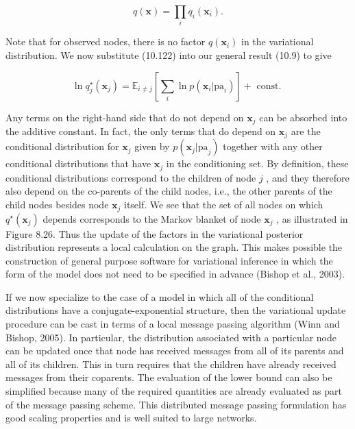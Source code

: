 \documentclass[
  10
]{article}
\begin{document}
\[
q (\mathbf {x}) = \prod_ {i} q _ {i} (\mathbf {x} _ {i}).\tag{10.123}
\]

Note that for observed nodes, there is no factor
\(q ( \mathbf { x } _ { i } )\) in the variational distribution. We now
substitute (10.122) into our general result (10.9) to give

\[
\ln q _ {j} ^ {\star} (\mathbf {x} _ {j}) = \mathbb {E} _ {i \neq j} \left[ \sum_ {i} \ln p (\mathbf {x} _ {i} | \mathrm{pa} _ {i}) \right] + \text { const. }\tag{10.124}
\]

Any terms on the right-hand side that do not depend on
\(\mathbf { x } _ { j }\) can be absorbed into the additive constant. In
fact, the only terms that do depend on \(\mathbf { x } _ { j }\) are the
conditional distribution for \(\mathbf { x } _ { j }\) given by
\(p ( \mathbf { x } _ { j } | \mathrm { p a } _ { j } )\) together with
any other conditional distributions that have \(\mathbf { x } _ { j }\)
in the conditioning set. By definition, these conditional distributions
correspond to the children of node \(j\) , and they therefore also
depend on the co-parents of the child nodes, i.e., the other parents of
the child nodes besides node \(\mathbf { x } _ { j }\) itself. We see
that the set of all nodes on which
\(q ^ { \star } ( \mathbf { x } _ { j } )\) depends corresponds to the
Markov blanket of node \(\mathbf { x } _ { j }\) , as illustrated in
Figure 8.26. Thus the update of the factors in the variational posterior
distribution represents a local calculation on the graph. This makes
possible the construction of general purpose software for variational
inference in which the form of the model does not need to be specified
in advance (Bishop et al., 2003).

If we now specialize to the case of a model in which all of the
conditional distributions have a conjugate-exponential structure, then
the variational update procedure can be cast in terms of a local message
passing algorithm (Winn and Bishop, 2005). In particular, the
distribution associated with a particular node can be updated once that
node has received messages from all of its parents and all of its
children. This in turn requires that the children have already received
messages from their coparents. The evaluation of the lower bound can
also be simplified because many of the required quantities are already
evaluated as part of the message passing scheme. This distributed
message passing formulation has good scaling properties and is well
suited to large networks.
\end{document}

